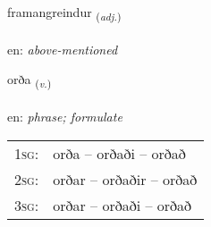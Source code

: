\documentclass[frontgrid, backgrid]{flacards}\usepackage[]{graphicx}\usepackage[]{color}
\begin{document}
\renewcommand{\blhead}{\vskip5pt {\small\bfseries\footnotesize Lýsingarorð | Adjective }}
\renewcommand{\bcfoot}{\vskip5pt \hspace{2pt}{\small\bfseries\footnotesize 2K}}


{framangreindur \small{\textsubscript{(\textit{adj.})}} \\[1ex] %
\textphonetic{[fraːmankreintʏr]} \\
en: \emph{above-mentioned} \\  [2ex]
\renewcommand*{\arraystretch}{0.8}
}

\renewcommand{\flhead}{\vskip5pt \fboxsep=0pt {\small\bfseries\footnotesize Sagnorð | Verb}}
\renewcommand{\fcfoot}{\vskip5pt \fboxsep=0pt \hspace{2pt}{\small\bfseries\footnotesize 2K}}

\renewcommand{\blhead}{\vskip5pt {\small\bfseries\footnotesize Sagnorð | Verb }}
\renewcommand{\bcfoot}{\vskip5pt \hspace{2pt}{\small\bfseries\footnotesize 2K}}


{orða \small{\textsubscript{(\textit{v.})}} \\[1ex] %
\textphonetic{[ɔrða]} \\
en: \emph{phrase; formulate} \\  [2ex]
\renewcommand*{\arraystretch}{0.8}
\begin{tabular}{p{1cm}l}
\textsc{1sg}: & orða -- orðaði -- orðað \\ 
\textsc{2sg}: & orðar -- orðaðir -- orðað \\ 
\textsc{3sg}: & orðar -- orðaði -- orðað \\ 
\end{tabular}
}
\end{document}

